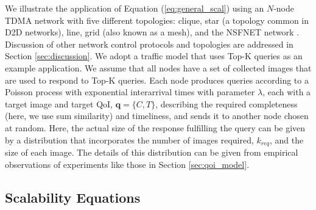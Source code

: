 
We illustrate the application of Equation (\ref{eq:general_scal}) using an $N$-node TDMA network with {\color{blue}five different topologies: clique, star (a topology common in D2D networks), line, grid (also known as a mesh), and the NSFNET network \cite{nsf_net}}.  Discussion of other network control protocols and topologies are addressed in Section \ref{sec:discussion}. We adopt a traffic model that uses Top-K queries as an example application.  We assume that all nodes have a set of collected images that are used to respond to Top-K queries.  Each node produces queries according to a Poisson process with exponential interarrival times with parameter $\lambda$, each with a target image and target QoI, $\mathbf{q} = \{C, T\}$, describing the required completeness (here, we use sum similarity) and timeliness, and sends it to another node chosen at random.  Here, the actual size of the response fulfilling the query can be given by a distribution that incorporates the number of images required, $k_{req}$, and the size of each image.  The details of this distribution can be given from empirical observations of experiments like those in Section \ref{sec:qoi_model}.


\subsection{Scalability Equations}

